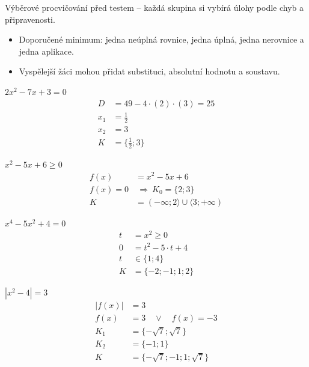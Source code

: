 \documentclass[11pt,a4paper]{article}
\begin{document}
Výběrové procvičování před testem – každá skupina si vybírá úlohy podle chyb a připravenosti.
\begin{itemize}
\item Doporučené minimum: jedna neúplná rovnice, jedna úplná, jedna nerovnice a jedna aplikace.
\item Vyspělejší žáci mohou přidat substituci, absolutní hodnotu a soustavu.
\end{itemize}
\begin{prikladReseniBox}[title={Příklad 1}]
$2x^{2} - 7x + 3=0$
\tcblower
\[
\begin{aligned}
D&=49-4\cdot(2)\cdot(3)=25\\[2pt]
x_1&=\frac{1}{2}\\[2pt]
x_2&=3\\[2pt]
K&=\{\frac{1}{2};3\}
\end{aligned}
\]
\end{prikladReseniBox}
\begin{prikladReseniBox}[title={Příklad 2}]
$x^{2} - 5x + 6\ge0$
\tcblower
\[
\begin{aligned}
f(x)&=x^{2} - 5x + 6\\[2pt]
f(x)=0&\ \Rightarrow\ K_0=\{2;3\}\\[2pt]
K&=(-\infty;2\rangle\cup\langle3;+\infty)
\end{aligned}
\]
\end{prikladReseniBox}
\begin{zadaniReseniBox}[title={Samostatná práce 1}]
$x^{4} - 5x^{2} + 4=0$
\tcblower
\[
\begin{aligned}
t&=x^2\ge0\\[2pt]
0&=t^{2} - 5 \cdot t + 4\\[2pt]
t&\in\{1;4\}\\[2pt]
K&=\{-2;-1;1;2\}
\end{aligned}
\]
\end{zadaniReseniBox}
\begin{zadaniReseniBox}[title={Samostatná práce 2}]
$\left|x^{2} - 4\right|=3$
\tcblower
\[
\begin{aligned}
|f(x)|&=3\\[2pt]
f(x)&=3\quad\vee\quad f(x)=-3\\[2pt]
K_1&=\{- \sqrt{7};\sqrt{7}\}\\[2pt]
K_2&=\{-1;1\}\\[2pt]
K&=\{- \sqrt{7};-1;1;\sqrt{7}\}
\end{aligned}
\]
\end{zadaniReseniBox}
\end{document}
